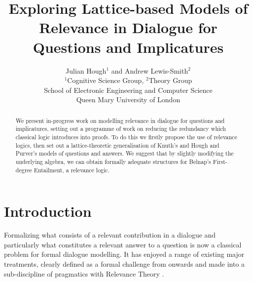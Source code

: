 \documentclass[11pt,a4paper]{article}
\title{Exploring Lattice-based Models of Relevance in Dialogue for Questions and Implicatures}
\author{Julian Hough$^{1}$ and Andrew Lewis-Smith$^{2}$ \\
  $^{1}$Cognitive Science Group, $^{2}$Theory Group\\
  School of Electronic Engineering and Computer Science \\
  Queen Mary University of London\\
   \email{\{j.hough,a.lewis-smith\}@qmul.ac.uk}}
\date{}
\theoremstyle{definition}
\begin{document}
\maketitle
\begin{abstract}
  We present in-progress work on modelling relevance in dialogue for questions and implicatures, setting out a programme of work on reducing the redundancy which classical logic introduces into proofs. To do this we firstly propose the use of relevance logics, then set out a lattice-theoretic generalisation of Knuth's and Hough and Purver's models of questions and answers. We suggest that by slightly modifying the underlying algebra, we can obtain formally adequate structures for Belnap's First-degree Entailment, a relevance logic.
\end{abstract}



\section{Introduction}
Formalizing what consists of a relevant contribution in a dialogue and particularly what constitutes a relevant answer to a question is now a classical problem for formal dialogue modelling. It has enjoyed a range of existing major treatments, clearly defined as a formal challenge from  onwards and made into a sub-discipline of pragmatics with Relevance Theory \cite{SperberWilson1986}.
\end{document}
